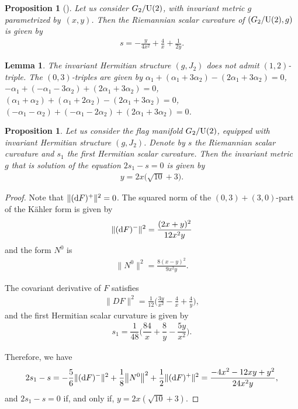 \documentclass[pdftex]{sigma}%
\numberwithin{equation}{section}
\newtheorem{Lemma}[Theorem]{Lemma}
\newtheorem{Proposition}[Theorem]{Proposition}
 { \theoremstyle{definition}
\newtheorem{Definition}[Theorem]{Definition}
\newtheorem{Question}[Theorem]{Question}
\newtheorem*{Notation}{Notation}
\newtheorem{Example}[Theorem]{Example}
\newtheorem{Remark}[Theorem]{Remark} }
\begin{document}
\begin{Proposition}[\cite{grego2}]
{\sloppy
Let us consider $G_{2}/{\rm U}(2)$, with invariant metric $g$ parametrized by~$(x,y)$. Then the Riemannian scalar curvature of $(G_{2}/{\rm U}(2),g)$ is given by
\begin{gather*}
s=-\frac{y}{4 x^2}+\frac{4}{x}+\frac{1}{2 y}.
\end{gather*}}
\end{Proposition}

\begin{Lemma}
The invariant Hermitian structure $(g, J_{2})$ does not admit $(1,2)$-triple. The $(0,3)$-triples are given by $\alpha_1+( \alpha_1+3\alpha_2) - ( 2\alpha_1+3\alpha_2)=0$, $-\alpha_1 + ( -\alpha_1-3\alpha_2)+(2\alpha_1+3\alpha_2)=0$, $(\alpha_1+\alpha_2) + ( \alpha_1+2\alpha_2)-(2\alpha_1+3\alpha_2)=0$, $( -\alpha_1-\alpha_2)+ ( -\alpha_1-2\alpha_2)+(2\alpha_1+3\alpha_2)=0$.
\end{Lemma}

\begin{Proposition}\label{prop-g2-j2}
Let us consider the flag manifold $G_{2}/{\rm U}(2)$, equipped with invariant Hermitian structure $(g, J_{2})$. Denote by $s$ the Riemannian scalar curvature and $s_1$ the first Hermitian scalar curvature. Then the invariant metric $g$ that is solution of the equation $2s_1-s=0$ is given by
 \begin{gather*}
y=2x\big(\sqrt{10} +3\big).
\end{gather*}
\end{Proposition}

\begin{proof}
Note that $\|({\rm d}F)^{+}\|^{2}=0$. The squared norm of the $(0,3)+(3,0)$-part of the K\"ahler form is given by
\begin{gather*}
\|({\rm d}F)^{-}\|^{2}=\frac{(2 x+y)^2}{12 x^2 y}
\end{gather*}
and the form $N^{0}$ is
\begin{gather*}
\big\|N^{0}\big\|^{2}=\frac{8 (x-y)^2}{9 x^2 y}.
\end{gather*}

The covariant derivative of $F$ satisfies
\begin{gather*}
\|DF\|^{2}=\frac{1}{12} \bigg(\frac{3 y}{x^2}-\frac{4}{x}+\frac{4}{y}\bigg),
\end{gather*}
and the first Hermitian scalar curvature is given by
\begin{gather*}
s_{1}=\dfrac{1}{48} \bigg(\dfrac{84}{x} + \dfrac{8}{y} - \dfrac{5 y}{x^2}\bigg).
\end{gather*}

Therefore, we have
\begin{align*}
2s_{1}-s=-\dfrac{5}{6}\|({\rm d}F)^{-}\|^{2}+\dfrac{1}{8}\big\|N^{0}\big\|^{2}+\dfrac{1}{2}\|({\rm d}F)^{+}\|^{2}
=\frac{-4 x^2-12 x y+y^2}{24 x^2 y},
\end{align*}
and $2s_{1}-s=0$ if, and only if, $y=2x (\sqrt{10}+3)$.
\end{proof}
\end{document}
